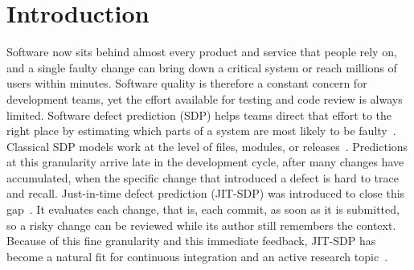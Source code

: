 \documentclass[final,5p,times,twocolumn]{elsarticle}
\theoremstyle{plain}
\begin{document}
\begin{abstract}

\end{abstract}


\section{Introduction}
\label{sec:introduction}

Software now sits behind almost every product and service that people rely on, and a single faulty change can bring down a critical system or reach millions of users within minutes. Software quality is therefore a constant concern for development teams, yet the effort available for testing and code review is always limited. Software defect prediction (SDP) helps teams direct that effort to the right place by estimating which parts of a system are most likely to be faulty~\cite{menzies2007data,lessmann2008benchmarking,hall2012systematic}. Classical SDP models work at the level of files, modules, or
releases~\cite{wang2016automatically,li2017software,zhou2022software}. Predictions at this granularity arrive late in the development cycle, after many changes have accumulated, when the specific change that introduced a defect is hard to trace and recall. Just-in-time defect prediction (JIT-SDP) was introduced to close this gap~\cite{mockus2000predicting,kamei2013large}. It evaluates each change, that is, each commit, as soon as it is submitted, so a
risky change can be reviewed while its author still remembers the context. Because of this fine granularity and this immediate feedback, JIT-SDP has become a natural fit for continuous integration and an active research topic~\cite{zhao2023systematic}.
\end{document}
